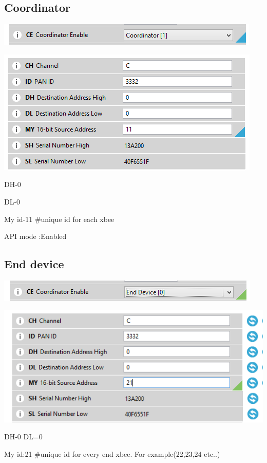 \documentclass[main.tex]{subfiles}
\begin{document}
\subsection{Coordinator}
\includegraphics[scale=1]{Images/corenb.png}

\includegraphics[scale=1]{Images/apicord.png}

DH-0

DL-0
 
My id-11 \#unique id for each xbee

API mode :Enabled
\subsection{End device}

\includegraphics[scale=1]{Images/endenb.png}

\includegraphics[scale=1]{Images/apiend.png}

DH-0
DL=0

My id:21 \#unique id for every end xbee. For example(22,23,24 etc..)
\end{document}
